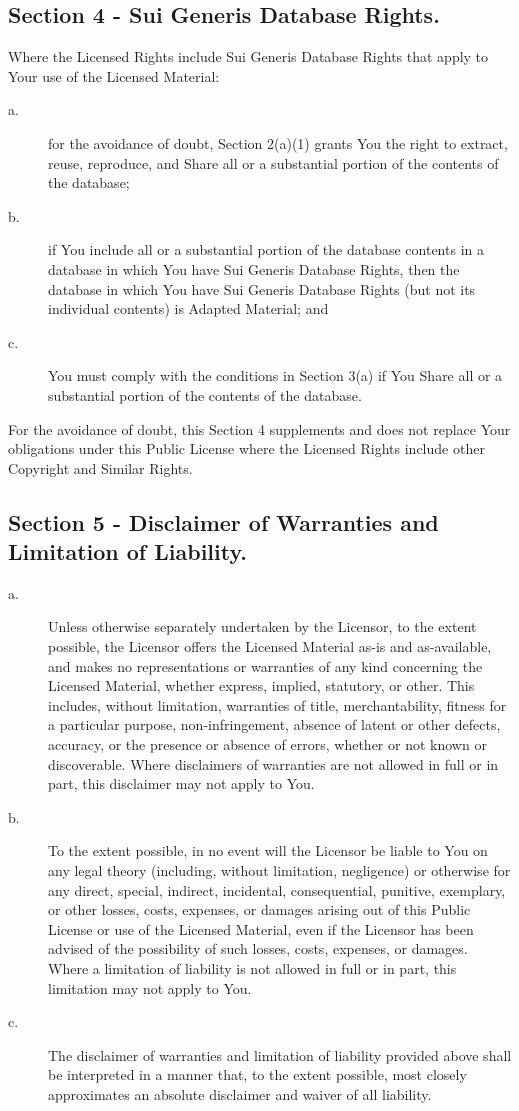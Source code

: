 \subsection{Section 4 - Sui Generis Database Rights.}

Where the Licensed Rights include Sui Generis Database Rights that apply to Your use of the Licensed Material:
\begin{description}
\item [a.] for the avoidance of doubt, Section 2(a)(1) grants You the right to extract, reuse, reproduce, and Share all or a substantial portion of the contents of the database;
\item [b.] if You include all or a substantial portion of the database contents in a database in which You have Sui Generis Database Rights, then the database in which You have Sui Generis Database Rights (but not its individual contents) is Adapted Material; and
\item [c.] You must comply with the conditions in Section 3(a) if You Share all or a substantial portion of the contents of the database.
\end{description}
For the avoidance of doubt, this Section 4 supplements and does not replace Your obligations under this Public License where the Licensed Rights include other Copyright and Similar Rights.

\subsection{Section 5 - Disclaimer of Warranties and Limitation of Liability.}
\begin{description}
\item [a.] Unless otherwise separately undertaken by the Licensor, to the extent possible, the Licensor offers the Licensed Material as-is and as-available, and makes no representations or warranties of any kind concerning the Licensed Material, whether express, implied, statutory, or other. This includes, without limitation, warranties of title, merchantability, fitness for a particular purpose, non-infringement, absence of latent or other defects, accuracy, or the presence or absence of errors, whether or not known or discoverable. Where disclaimers of warranties are not allowed in full or in part, this disclaimer may not apply to You.
\item [b.] To the extent possible, in no event will the Licensor be liable to You on any legal theory (including, without limitation, negligence) or otherwise for any direct, special, indirect, incidental, consequential, punitive, exemplary, or other losses, costs, expenses, or damages arising out of this Public License or use of the Licensed Material, even if the Licensor has been advised of the possibility of such losses, costs, expenses, or damages. Where a limitation of liability is not allowed in full or in part, this limitation may not apply to You.
\item [c.] The disclaimer of warranties and limitation of liability provided above shall be interpreted in a manner that, to the extent possible, most closely approximates an absolute disclaimer and waiver of all liability.
\end{description}

